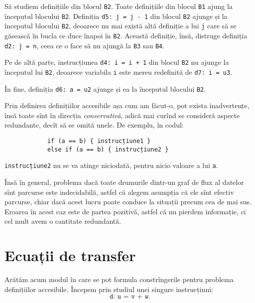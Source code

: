 Să studiem definițiile din blocul \texttt{B2}. Toate definițiile din blocul
\texttt{B1} ajung la începutul blocului \texttt{B2}. Definiția
\texttt{d5:\!\!\!\! j = j - 1} din blocul \texttt{B2} ajunge și la începutul blocului
\texttt{B2}, deoarece nu mai există altă definiție a lui \texttt{j} care să
se găsească în bucla ce duce înapoi în \texttt{B2}. Această definiție, însă,
distruge definiția \texttt{d2:\!\!\!\! j = n}, ceea ce o face să nu ajungă la
\texttt{B3} sau \texttt{B4}.

Pe de altă parte, instrucțiunea \texttt{d4:\!\!\!\! i = i + 1} din blocul \texttt{B2}
nu ajunge la începutul lui \texttt{B2}, deoarece variabila \texttt{i} este
mereu redefinită de \texttt{d7:\!\!\!\! i = u3}.

În fine, definiția \texttt{d6:\!\!\!\! a = u2} ajunge și ea la începutul blocului
\texttt{B2}.

\begin{remark}\label{rk:safe}
    Prin definirea definițiilor accesibile așa cum am făcut-o, pot exista
    inadvertențe, însă toate sînt în direcția \emph{conservativă}, adică mai curînd
    se consideră aspecte redundante, decît să se omită unele. De exemplu, în codul:
    \begin{center}
        \begin{BVerbatim}
            if (a == b) { instrucțiune1 } 
            else if (a == b) { instrucțiune2 }
        \end{BVerbatim}
    \end{center}
    \texttt{instrucțiune2} nu se va atinge niciodată, pentru nicio valoare a lui \texttt{a}.

    Însă în general, problema dacă toate drumurile dintr-un graf de flux al datelor
    sînt parcurse este indecidabilă, astfel că alegem asumpția că ele sînt efectiv
    parcurse, chiar dacă acest lucru poate conduce la situații precum cea de mai
    sus. Eroarea în acest caz este de partea pozitivă, astfel că nu pierdem informație,
    ci cel mult avem o cantitate redundantă.
\end{remark}

\section{Ecuații de transfer}

Arătăm acum modul în care se pot formula constrîngerile pentru problema
definițiilor accesibile. Începem prin studiul unei singure instrucțiuni:
\[
    \texttt{d: u = v + w}.
\]

